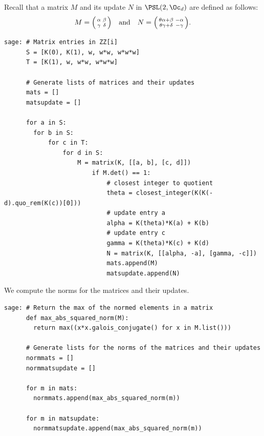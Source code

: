 \documentclass[runningheads]{llncs}
\begin{document}
Recall that a matrix \(M\) and its update \(N\) in \(\PSL(2,\Oc_d)\) are defined as follows:
\begin{equation*}M = \begin{psmallmatrix} \alpha & \beta \\ \gamma & \delta \end{psmallmatrix} \quad \text{and} \quad
    N =
    \begin{psmallmatrix}
    \theta \alpha + \beta & -\alpha \\ 
    \theta \gamma + \delta & - \gamma
    \end{psmallmatrix}.
\end{equation*}
\begin{lstlisting}
sage: # Matrix entries in ZZ[i]
      S = [K(0), K(1), w, w*w, w*w*w]
      T = [K(1), w, w*w, w*w*w]

      # Generate lists of matrices and their updates
      mats = []
      matsupdate = []

      for a in S:
        for b in S:
            for c in T: 
                for d in S:
                    M = matrix(K, [[a, b], [c, d]])
                        if M.det() == 1:
                            # closest integer to quotient
                            theta = closest_integer(K(K(-d).quo_rem(K(c))[0]))
                            # update entry a
                            alpha = K(theta)*K(a) + K(b)
                            # update entry c
                            gamma = K(theta)*K(c) + K(d)
                            N = matrix(K, [[alpha, -a], [gamma, -c]])                        
                            mats.append(M)                 
                            matsupdate.append(N)
\end{lstlisting}

We compute the norms for the matrices and their updates.
\begin{lstlisting}
sage: # Return the max of the normed elements in a matrix
      def max_abs_squared_norm(M):
        return max((x*x.galois_conjugate() for x in M.list()))

      # Generate lists for the norms of the matrices and their updates
      normmats = []
      normmatsupdate = []
      
      for m in mats:
        normmats.append(max_abs_squared_norm(m))

      for m in matsupdate:
        normmatsupdate.append(max_abs_squared_norm(m))
\end{lstlisting}
\end{document}
